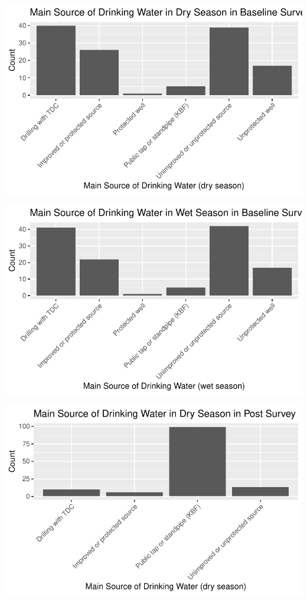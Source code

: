 \documentclass[
  letterpaper,
  DIV=11,
  numbers=noendperiod]{scrartcl}
\begin{document}
\includegraphics{report_files/figure-pdf/unnamed-chunk-31-1.pdf}

\includegraphics{report_files/figure-pdf/unnamed-chunk-32-1.pdf}

\includegraphics{report_files/figure-pdf/unnamed-chunk-33-1.pdf}
\end{document}
